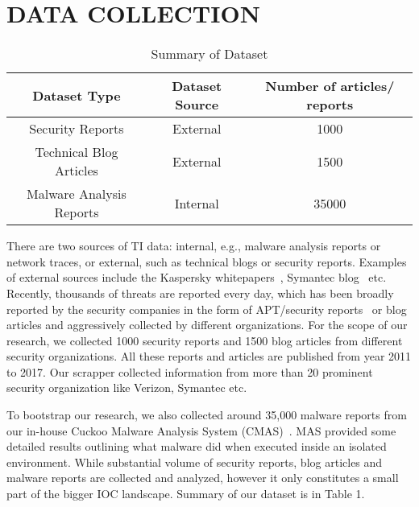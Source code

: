 \chapter{DATA COLLECTION}
\label{data}


\begin{table}[tb]
\caption[]{Summary of Dataset} %
\centering %
\begin{tabular}{|c| c| c|} %
\hline
\multicolumn{1}{|c|}{\textbf{Dataset Type}} & \multicolumn{1}{c}{\textbf{Dataset Source}} & \multicolumn{1}{|c|}{\textbf{Number of articles/ reports}}\\

\hline %
Security Reports & External & 1000 \\ %
\hline
Technical Blog Articles & External & 1500 \\
\hline
Malware Analysis Reports & Internal & 35000 \\[1ex] %
\hline %
\end{tabular}
\label{table:dataset} %
\end{table}


There are two sources of TI data: internal, e.g., malware analysis reports or network traces, or external, such as technical blogs or security reports. Examples of external sources include the Kaspersky whitepapers~\cite{kaspersky}, Symantec blog~\cite{symantecblog} etc. Recently, thousands of threats are reported every day, which has been broadly reported by the security companies in the form of APT/security reports~\cite{daly} or blog articles and aggressively collected by different organizations. For the scope of our research, we collected 1000 security reports and 1500 blog articles from different security organizations. All these reports and articles are published from year 2011 to 2017. Our scrapper collected information from more than 20 prominent security organization like Verizon, Symantec etc.

To bootstrap our research, we also collected around 35,000 malware reports from our in-house Cuckoo Malware Analysis System (CMAS)~\cite{oktavianto}. MAS provided some detailed results outlining what malware did when executed inside an isolated environment. While substantial volume of security reports, blog articles and malware reports are collected and analyzed, however it only constitutes a small part of the bigger IOC landscape. Summary of our dataset is in Table 1.  



